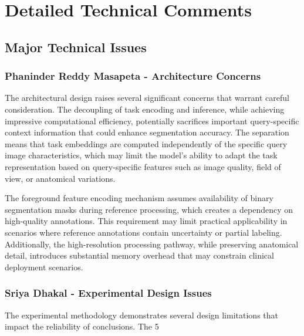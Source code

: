 \section{Detailed Technical Comments}
\label{sec:detailed_comments}

\subsection{Major Technical Issues}
\subsubsection{Phaninder Reddy Masapeta - Architecture Concerns}
The architectural design raises several significant concerns that warrant careful consideration. The decoupling of task encoding and inference, while achieving impressive computational efficiency, potentially sacrifices important query-specific context information that could enhance segmentation accuracy. The separation means that task embeddings are computed independently of the specific query image characteristics, which may limit the model's ability to adapt the task representation based on query-specific features such as image quality, field of view, or anatomical variations.

The foreground feature encoding mechanism assumes availability of binary segmentation masks during reference processing, which creates a dependency on high-quality annotations. This requirement may limit practical applicability in scenarios where reference annotations contain uncertainty or partial labeling. Additionally, the high-resolution processing pathway, while preserving anatomical detail, introduces substantial memory overhead that may constrain clinical deployment scenarios.

\subsubsection{Sriya Dhakal - Experimental Design Issues}
The experimental methodology demonstrates several design limitations that impact the reliability of conclusions. The 5%

